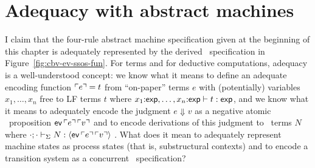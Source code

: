 








\section{Adequacy with abstract machines}
\label{sec:nat-ssos-adequacy}

I 
claim that the four-rule abstract machine specification given at the
beginning of this chapter is adequately represented by the derived
\sls~specification in Figure~\ref{fig:cbv-ev-ssos-fun}. For terms and
for deductive computations, adequacy is a well-understood concept: we
know what it means to define an adequate encoding function ${\ulcorner{e}\urcorner}
= t$ from ``on-paper'' terms $e$ with (potentially) variables
$x_1,\ldots,x_n$ free to LF terms $t$ where $x_1{:}{\sf
  exp},\ldots,x_n{:}{\sf exp} \vdash t : {\sf exp}$, and we know what
it means to adequately encode the judgment $e \Downarrow v$ as a
negative atomic \sls~proposition ${\sf ev}\,{\ulcorner{e}\urcorner}\,{\ulcorner{v}\urcorner}$
and to encode derivations of this judgment to \sls~terms $N$ where
${\cdot}; {\cdot} \vdash_{\Sigma} {N} : {\langle {{\sf
      ev}\,{\ulcorner{e}\urcorner}\,{\ulcorner{v}\urcorner}} \rangle}$
\cite{harper93framework,harper07mechanizing}. What does it mean to
adequately represent machine states as process states (that is,
substructural contexts) and to encode a transition system as a 
concurrent \sls~specification? 


